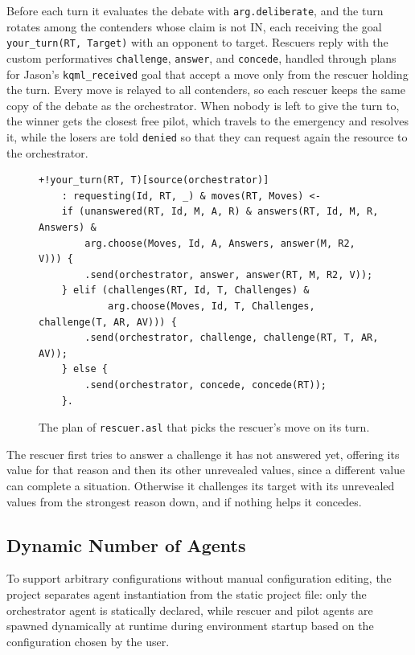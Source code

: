 Before each turn it evaluates the debate with \texttt{arg.deliberate}, and the turn rotates among the contenders whose claim is not IN, each receiving the goal \texttt{your\_turn(RT, Target)} with an opponent to target.
Rescuers reply with the custom performatives \texttt{challenge}, \texttt{answer}, and \texttt{concede}, handled through plans for Jason's \texttt{kqml\_received} goal that accept a move only from the rescuer holding the turn.
Every move is relayed to all contenders, so each rescuer keeps the same copy of the debate as the orchestrator.
When nobody is left to give the turn to, the winner gets the closest free pilot, which travels to the emergency and resolves it, while the losers are told \texttt{denied} so that they can request again the resource to the orchestrator.




\begin{figure}[htbp]
\centering
\begin{minipage}{0.95\textwidth}
\footnotesize
\begin{verbatim}
+!your_turn(RT, T)[source(orchestrator)]
    : requesting(Id, RT, _) & moves(RT, Moves) <-
    if (unanswered(RT, Id, M, A, R) & answers(RT, Id, M, R, Answers) &
        arg.choose(Moves, Id, A, Answers, answer(M, R2, V))) {
        .send(orchestrator, answer, answer(RT, M, R2, V));
    } elif (challenges(RT, Id, T, Challenges) &
            arg.choose(Moves, Id, T, Challenges, challenge(T, AR, AV))) {
        .send(orchestrator, challenge, challenge(RT, T, AR, AV));
    } else {
        .send(orchestrator, concede, concede(RT));
    }.
\end{verbatim}
\end{minipage}
\caption{The plan of \texttt{rescuer.asl} that picks the rescuer's move on its turn.}
\label{fig:impl_rescuer_turn}
\end{figure}

The rescuer first tries to answer a challenge it has not answered yet, offering its value for that reason and then its other unrevealed values, since a different value can complete a situation.
Otherwise it challenges its target with its unrevealed values from the strongest reason down, and if nothing helps it concedes.

\subsection{Dynamic Number of Agents}
\label{subsec:dynamic_agents}

To support arbitrary configurations without manual configuration editing, the project separates agent instantiation from the static project file: only the orchestrator agent is statically declared, while rescuer and pilot agents are spawned dynamically at runtime during environment startup based on the configuration chosen by the user.

